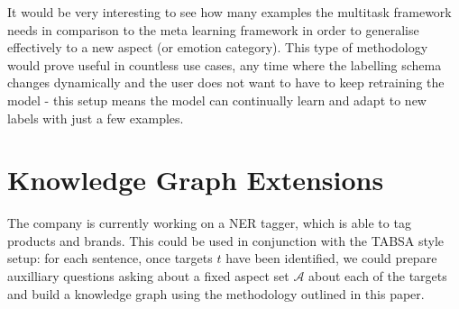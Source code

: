 It would be very interesting to see how many examples the multitask framework needs in comparison to the meta learning framework in order to generalise effectively to a new aspect (or emotion category). This type of methodology would prove useful in countless use cases, any time where the labelling schema changes dynamically and the user does not want to have to keep retraining the model - this setup means the model can continually learn and adapt to new labels with just a few examples.

\section{Knowledge Graph Extensions}
The company is currently working on a NER tagger, which is able to tag products and brands. This could be used in conjunction with the TABSA style setup: for each sentence, once targets $t$ have been identified, we could prepare auxilliary questions asking about a fixed aspect set $\mathcal{A}$ about each of the targets and build a knowledge graph using the methodology outlined in this paper.